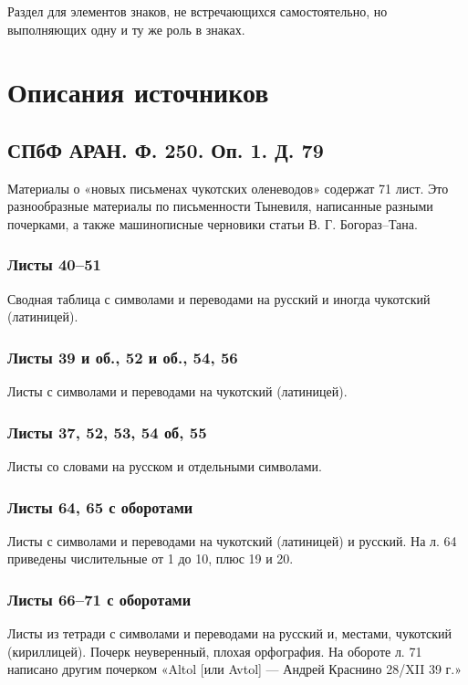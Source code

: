 \documentclass{article}
\begin{document}
Раздел для элементов знаков, не встречающихся самостоятельно, но выполняющих одну и ту же роль в знаках.

\section{Описания источников} 

\subsection{СПбФ АРАН. Ф. 250. Оп. 1. Д. 79}

Материалы о «новых письменах чукотских оленеводов» содержат 71 лист. Это разнообразные материалы по письменности Тыневиля, написанные разными почерками, а также машинописные черновики статьи В. Г. Богораз–Тана. 

\subsubsection{Листы 40–51}

Сводная таблица с символами и переводами на русский и иногда чукотский (латиницей).

\subsubsection{Листы 39 и об., 52 и об., 54, 56}

Листы с символами и переводами на чукотский (латиницей).

\subsubsection{Листы 37, 52, 53, 54 об, 55}

Листы со словами на русском и отдельными символами.

\subsubsection{Листы 64, 65 с оборотами}

Листы с символами и переводами на чукотский (латиницей) и русский. На л. 64 приведены числительные от 1 до 10, плюс 19 и 20.

\subsubsection{Листы 66–71 с оборотами}

Листы из тетради с символами и переводами на русский и, местами, чукотский (кириллицей). Почерк неуверенный, плохая орфография. На обороте л. 71 написано другим почерком «Altol [или Avtol] — Андрей Краснино 28/XII 39 г.»
\end{document}
